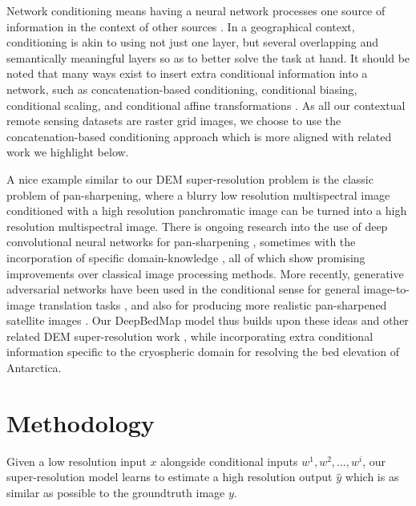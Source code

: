 \documentclass[tc, manuscript]{copernicus}
\begin{document}
Network conditioning means having a neural network processes one source of information in the context of other sources \citep{DumoulinFeaturewisetransformations2018}.
In a geographical context, conditioning is akin to using not just one layer, but several overlapping and semantically meaningful layers so as to better solve the task at hand.
It should be noted that many ways exist to insert extra conditional information into a network, such as concatenation-based conditioning, conditional biasing, conditional scaling, and conditional affine transformations \citep{DumoulinFeaturewisetransformations2018}.
As all our contextual remote sensing datasets are raster grid images, we choose to use the concatenation-based conditioning approach which is more aligned with related work we highlight below.

A nice example similar to our DEM super-resolution problem is the classic problem of pan-sharpening, where a blurry low resolution multispectral image conditioned with a high resolution panchromatic image can be turned into a high resolution multispectral image.
There is ongoing research into the use of deep convolutional neural networks for pan-sharpening \citep{MasiPansharpeningConvolutionalNeural2016,ScarpaTargetAdaptiveCNNBasedPansharpening2018}, sometimes with the incorporation of specific domain-knowledge \citep{YangPanNetDeepNetwork2017}, all of which show promising improvements over classical image processing methods.
More recently, generative adversarial networks \citep{GoodfellowGenerativeAdversarialNetworks2014} have been used in the conditional sense for general image-to-image translation tasks \citep[e.g.][]{IsolaImagetoImageTranslationConditional2016,ParkSemanticImageSynthesis2019}, and also for producing more realistic pan-sharpened satellite images \citep{LiuPSGANGenerativeAdversarial2018}.
Our DeepBedMap model thus builds upon these ideas and other related DEM super-resolution work \citep{XuNonlocalsimilaritybased2015,ChenConvolutionalNeuralNetwork2016}, while incorporating extra conditional information specific to the cryospheric domain for resolving the bed elevation of Antarctica.

\section{Methodology}

Given a low resolution input $x$ alongside conditional inputs $w^1, w^2, \dots, w^i$, our super-resolution model learns to estimate a high resolution output $\hat{y}$ which is as similar as possible to the groundtruth image $y$.
\end{document}
